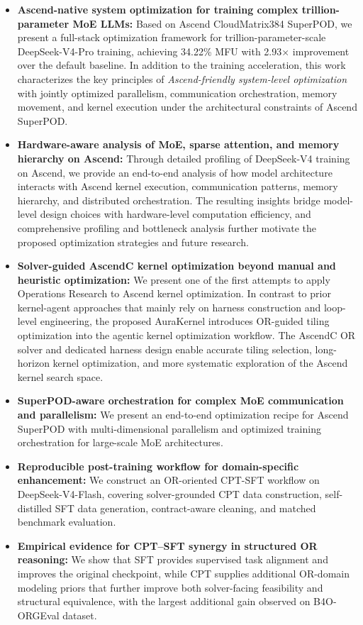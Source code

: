 \begin{itemize}
\item \textbf{Ascend-native system optimization for training complex trillion-parameter MoE LLMs:}
Based on Ascend CloudMatrix384 SuperPOD, we present a full-stack optimization framework for trillion-parameter-scale DeepSeek-V4-Pro training, achieving 34.22\% MFU with 2.93$\times$ improvement over the default baseline. 
In addition to the training acceleration, this work characterizes the key principles of \emph{Ascend-friendly system-level optimization} with jointly optimized parallelism, communication orchestration, memory movement, and kernel execution under the architectural constraints of Ascend SuperPOD. 

\item \textbf{Hardware-aware analysis of MoE, sparse attention, and memory hierarchy on Ascend:}
Through detailed profiling of DeepSeek-V4 training on Ascend, we provide an end-to-end analysis of how model architecture interacts with Ascend kernel execution, communication patterns, memory hierarchy, and distributed orchestration. 
The resulting insights bridge model-level design choices with hardware-level computation efficiency, and comprehensive profiling and bottleneck analysis further motivate the proposed optimization strategies and future research.

\item \textbf{Solver-guided AscendC kernel optimization beyond manual and heuristic optimization:}
We present one of the first attempts to apply Operations Research to Ascend kernel optimization. In contrast to prior kernel-agent approaches that mainly rely on harness construction and loop-level engineering, the proposed AuraKernel introduces OR-guided tiling optimization into the agentic kernel optimization workflow. The AscendC OR solver and dedicated harness design enable accurate tiling selection, long-horizon kernel optimization, and more systematic exploration of the Ascend kernel search space.

\item \textbf{SuperPOD-aware orchestration for complex MoE communication and parallelism:}
We present an end-to-end optimization recipe for Ascend SuperPOD with multi-dimensional parallelism and optimized training orchestration for large-scale MoE architectures.

\item \textbf{Reproducible post-training workflow for domain-specific enhancement:}
We construct an OR-oriented CPT-SFT workflow on DeepSeek-V4-Flash, covering solver-grounded CPT data construction, self-distilled SFT data generation, contract-aware cleaning, and matched benchmark evaluation.

\item \textbf{Empirical evidence for CPT–SFT synergy in structured OR reasoning:}
We show that SFT provides supervised task alignment and improves the original checkpoint, while CPT supplies additional OR-domain modeling priors that further improve both solver-facing feasibility and structural equivalence, with the largest additional gain observed on B4O-ORGEval dataset.

\end{itemize}

